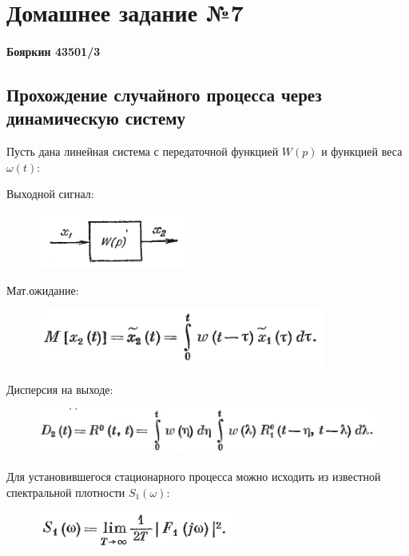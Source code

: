 \documentclass[14pt,a4paper,report]{report}
\begin{document}
\chapter{Домашнее задание №7}

\subsubsection{Бояркин 43501/3}

\section{Прохождение случайного процесса через динамическую систему}

Пусть дана линейная система с передаточной функцией $W(p)$ и функцией веса $\omega(t)$:

Выходной сигнал:

\begin{figure}[h!]
	\centering
	\includegraphics[scale = 0.79]{images/1.png}
	\label{image:1}
\end{figure}

Мат.ожидание:

\begin{figure}[h!]
	\centering
	\includegraphics[scale = 0.79]{images/2.png}
	\label{image:2}
\end{figure}

Дисперсия на выходе:

\begin{figure}[h!]
	\centering
	\includegraphics[scale = 0.79]{images/3.png}
	\label{image:3}
\end{figure}

Для установившегося стационарного процесса можно исходить из известной спектральной плотности $S_1(\omega)$:

\begin{figure}[h!]
	\centering
	\includegraphics[scale = 0.79]{images/4.png}
	\label{image:4}
\end{figure}
\end{document}
